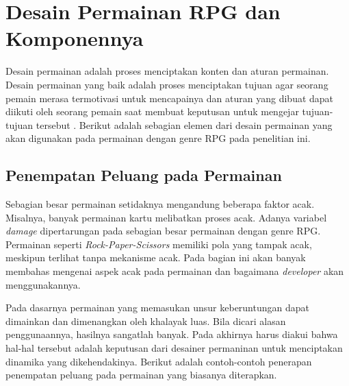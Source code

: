 \section{Desain Permainan RPG dan Komponennya}
\label{sec:sec2_gdd}
\vspace{1ex}

Desain permainan adalah proses menciptakan konten dan aturan permainan. Desain permainan yang baik adalah proses menciptakan tujuan agar seorang pemain merasa termotivasi untuk mencapainya dan aturan yang dibuat dapat diikuti oleh seorang pemain saat membuat keputusan untuk mengejar tujuan-tujuan tersebut \citep{Brathwaite2009}. Berikut adalah sebagian elemen dari desain permainan yang akan digunakan pada permainan dengan genre RPG pada penelitian ini.
\vspace{1ex}

\subsection{Penempatan Peluang pada Permainan}
\label{sec:sub_sec2_kesempatan}
\vspace{1ex}

Sebagian besar permainan setidaknya mengandung beberapa faktor acak. Misalnya, banyak permainan kartu melibatkan proses acak. Adanya variabel \textit{damage} dipertarungan pada sebagian besar permainan dengan genre RPG. Permainan seperti \textit{Rock-Paper-Scissors} memiliki pola yang tampak acak, meskipun terlihat tanpa mekanisme acak. Pada bagian ini akan banyak membahas mengenai aspek acak pada permainan dan bagaimana \textit{developer} akan menggunakannya.
\vspace{1ex}

Pada dasarnya permainan yang memasukan unsur keberuntungan dapat dimainkan dan dimenangkan oleh khalayak luas. Bila dicari alasan penggunaannya, hasilnya sangatlah banyak. Pada akhirnya harus diakui bahwa hal-hal tersebut adalah keputusan dari desainer permaninan untuk menciptakan dinamika yang dikehendakinya. Berikut adalah contoh-contoh penerapan penempatan peluang pada permainan yang biasanya diterapkan.

